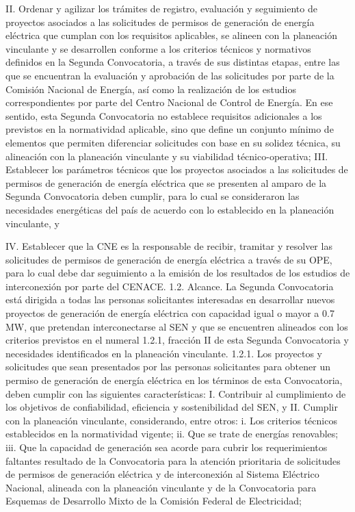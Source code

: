 II. Ordenar y agilizar los trámites de registro, evaluación y seguimiento de proyectos asociados a las solicitudes de permisos de generación de energía eléctrica que cumplan con los requisitos aplicables, se alineen con la planeación vinculante y se desarrollen conforme a los criterios técnicos y normativos definidos en la Segunda Convocatoria, a través de sus distintas etapas, entre las que se encuentran la evaluación y aprobación de las solicitudes por parte de la Comisión Nacional de Energía, así como la realización de los estudios correspondientes por parte del Centro Nacional de Control de Energía.
En ese sentido, esta Segunda Convocatoria no establece requisitos adicionales a los previstos en la normatividad aplicable, sino que define un conjunto mínimo de elementos que permiten diferenciar solicitudes con base en su solidez técnica, su alineación con la planeación vinculante y su viabilidad técnico-operativa;
III. Establecer los parámetros técnicos que los proyectos asociados a las solicitudes de permisos de generación de energía eléctrica que se presenten al amparo de la Segunda Convocatoria deben cumplir, para lo cual se consideraron las necesidades energéticas del país de acuerdo con lo establecido en la planeación vinculante, y\par
IV. Establecer que la CNE es la responsable de recibir, tramitar y resolver las solicitudes de permisos de generación de energía eléctrica a través de su OPE, para lo cual debe dar seguimiento a la emisión de los resultados de los estudios de interconexión por parte del CENACE.
1.2. Alcance. La Segunda Convocatoria está dirigida a todas las personas solicitantes interesadas en desarrollar nuevos proyectos de generación de energía eléctrica con capacidad igual o mayor a 0.7 MW, que pretendan interconectarse al SEN y que se encuentren alineados con los criterios previstos en el numeral 1.2.1, fracción II de esta Segunda Convocatoria y necesidades identificados en la planeación vinculante.
1.2.1. Los proyectos y solicitudes que sean presentados por las personas solicitantes para obtener un permiso de generación de energía eléctrica en los términos de esta Convocatoria, deben cumplir con las siguientes características:
I. Contribuir al cumplimiento de los objetivos de confiabilidad, eficiencia y sostenibilidad del SEN, y
II. Cumplir con la planeación vinculante, considerando, entre otros:
i. Los criterios técnicos establecidos en la normatividad vigente;
ii. Que se trate de energías renovables;
iii. Que la capacidad de generación sea acorde para cubrir los requerimientos faltantes resultado de la Convocatoria para la atención prioritaria de solicitudes de permisos de generación eléctrica y de interconexión al Sistema Eléctrico Nacional, alineada con la planeación vinculante y de la Convocatoria para Esquemas de Desarrollo Mixto de la Comisión Federal de Electricidad;
